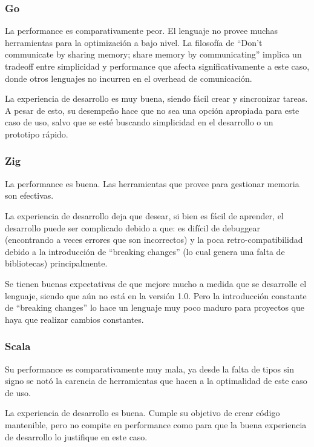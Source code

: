 \documentclass[11pt]{article}
\let\Oldsubsubsection\subsubsection
\renewcommand{\subsubsection}{\FloatBarrier\Oldsubsubsection}
\begin{document}
\subsubsection{Go}

La performance es comparativamente peor. El lenguaje no provee muchas herramientas para la optimización a bajo nivel. La filosofía de “Don't communicate by sharing memory; share memory by communicating” implica un tradeoff entre simplicidad y performance que afecta significativamente a este caso, donde otros lenguajes no incurren en el overhead de comunicación.

La experiencia de desarrollo es muy buena, siendo fácil crear y sincronizar tareas. A pesar de esto, su desempeño hace que no sea una opción apropiada para este caso de uso, salvo que se esté buscando simplicidad en el desarrollo o un prototipo rápido.

\subsubsection{Zig}

La performance es buena. Las herramientas que provee para gestionar memoria son efectivas.

La experiencia de desarrollo deja que desear, si bien es fácil de aprender, el desarrollo puede ser complicado debido a que: es difícil de debuggear (encontrando a veces errores que son incorrectos) y la poca retro-compatibilidad debido a la introducción de “breaking changes” (lo cual genera una falta de bibliotecas) principalmente. 

Se tienen buenas expectativas de que mejore mucho a medida que se desarrolle el lenguaje, siendo que aún no está en la versión 1.0. Pero la introducción constante de “breaking changes” lo hace un lenguaje muy poco maduro para proyectos que haya que realizar cambios constantes.

\subsubsection{Scala}

Su performance es comparativamente muy mala, ya desde la falta de tipos sin signo se notó la carencia de herramientas que hacen a la optimalidad de este caso de uso.

La experiencia de desarrollo es buena. Cumple su objetivo de crear código mantenible, pero no compite en performance como para que la buena experiencia de desarrollo lo justifique en este caso.
\end{document}
